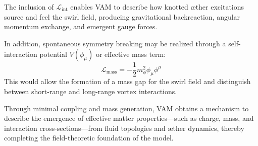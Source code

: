 \documentclass[a4paper,12pt]{article}
\begin{document}
        The inclusion of $\mathcal{L}_{\text{int}}$ enables VAM to describe how knotted æther excitations source and feel the swirl field, producing gravitational backreaction, angular momentum exchange, and emergent gauge forces.

        In addition, spontaneous symmetry breaking may be realized through a self-interaction potential $V(\phi_\mu)$ or effective mass term:
        \begin{equation}
            \mathcal{L}_{\text{mass}} = -\frac{1}{2} m_\phi^2 \phi_\mu \phi^\mu
        \end{equation}
        This would allow the formation of a mass gap for the swirl field and distinguish between short-range and long-range vortex interactions.

        Through minimal coupling and mass generation, VAM obtains a mechanism to describe the emergence of effective matter properties---such as charge, mass, and interaction cross-sections---from fluid topologies and æther dynamics, thereby completing the field-theoretic foundation of the model.

    
    
\end{document}
